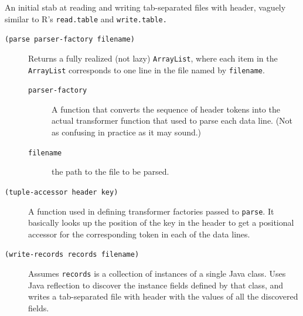 \documentclass[10pt,openany]{article}
\numberwithin{definition}{section}
\numberwithin{example}{section}
\numberwithin{equation}{section}
\numberwithin{figure}{section}
\begin{document}
An initial stab at reading and writing tab-separated files with header,
vaguely similar to R's \texttt{read.table} and \texttt{write.table.}
\begin{description}
\item [{\texttt{(parse~parser-factory~filename)}}] Returns a fully realized
(not lazy) \texttt{ArrayList}, where each item in the \texttt{ArrayList}
corresponds to one line in the file named by \texttt{filename}.

\begin{description}
\item [{\texttt{parser-factory}}] A function that converts the sequence
of header tokens into the actual transformer function that used to
parse each data line. (Not as confusing in practice as it may sound.)
\item [{\texttt{filename}}] the path to the file to be parsed.
\end{description}
\item [{\texttt{(tuple-accessor~header~key)}}] A function used in defining
transformer factories passed to \texttt{parse}. It basically looks
up the position of the key in the header to get a positional accessor
for the corresponding token in each of the data lines.
\item [{\texttt{(write-records~records~filename)}}] Assumes \texttt{records}
is a collection of instances of a single Java class. Uses Java reflection
to discover the instance fields defined by that class, and writes
a tab-separated file with header with the values of all the discovered
fields.
\end{description}
\newpage{}


% 
% 
% 
% 
% 

\newpage{}


\end{document}
